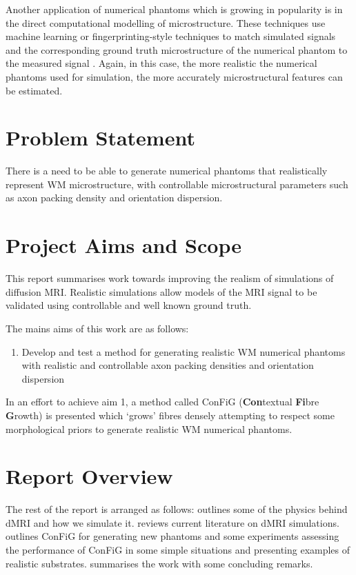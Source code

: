 Another application of numerical phantoms which is growing in popularity is in the direct computational modelling of microstructure.
These techniques use machine learning or fingerprinting-style techniques to match simulated signals and the corresponding ground truth microstructure of the numerical phantom to the measured signal \cite{Rensonnet2018,Hill2018,Palombo2018a,Nedjati-Gilani2017}.
Again, in this case, the more realistic the numerical phantoms used for simulation, the more accurately microstructural features can be estimated. 


\section{Problem Statement}
\label{sec:intro_problem_statement}
There is a need to be able to generate numerical phantoms that realistically represent \ac{WM} microstructure, with controllable microstructural parameters such as axon packing density and orientation dispersion.


\section{Project Aims and Scope}
\label{sec:intro_project_aims}
This report summarises work towards improving the realism of simulations of diffusion \ac{MRI}. Realistic simulations allow models of the MRI signal to be validated using controllable and well known ground truth.

 

The mains aims of this work are as follows:
\begin{enumerate}
\item Develop and test a method for generating realistic \ac{WM} numerical phantoms with realistic and controllable axon packing densities and orientation dispersion
\end{enumerate}

In an effort to achieve aim 1, a method called \acs{ConFiG} (\textbf{Con}textual \textbf{Fi}bre \textbf{G}rowth) is presented which `grows' fibres densely attempting to respect some morphological priors to generate realistic \ac{WM} numerical phantoms.

\section{Report Overview}
\label{sec:intro_report_overview}
The rest of the report is arranged as follows:  outlines some of the physics behind \acl{dMRI} and how we simulate it.  reviews current literature on \ac{dMRI} simulations.  outlines \ac{ConFiG} for generating new phantoms and some experiments assessing the performance of \ac{ConFiG} in some simple situations and presenting examples of realistic substrates.  summarises the work with some concluding remarks.



